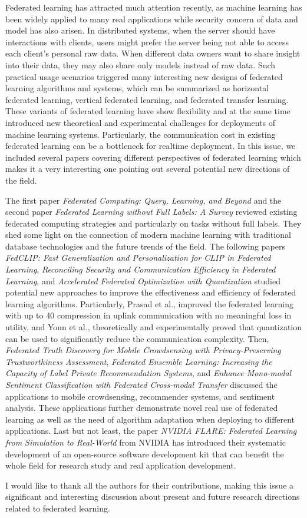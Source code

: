 \documentclass[11pt]{article}
\begin{document}
Federated learning has attracted much attention recently, as machine
learning has been widely applied to many real applications while
security concern of data and model has also arisen. In distributed
systems, when the server should have interactions with clients, users
might prefer the server being not able to access each client's
personal raw data. When different data owners want to share insight
into their data, they may also share only models instead of raw
data. Such practical usage scenarios triggered many interesting new
designs of federated learning algorithms and systems, which can be
summarized as horizontal federated learning, vertical federated
learning, and federated transfer learning. These variants of federated
learning have show flexibility and at the same time introduced new
theoretical and experimental challenges for deployments of machine
learning systems. Particularly, the communication cost in existing
federated learning can be a bottleneck for realtime deployment. In
this issue, we included several papers covering different perspectives
of federated learning which makes it a very interesting one pointing
out several potential new directions of the field.

The first paper
{\it Federated Computing: Query, Learning, and Beyond} and
the second paper
{\it Federated Learning without Full Labels: A Survey}
reviewed existing federated computing strategies and particularly on tasks without full labels.
They shed some light on the connection of modern machine learning with traditional database technologies and the future trends of the field.
The following papers
{\it FedCLIP: Fast Generalization and Personalization for CLIP in Federated Learning},
{\it Reconciling Security and Communication Efficiency in Federated Learning}, and
{\it Accelerated Federated Optimization with Quantization}
studied potential new approaches to improve the effectiveness and efficiency of federated learning algorithms.
Particularly, Prasad et al., improved the federated learning with up to 40 compression in uplink
communication with no meaningful loss in utility, and Youn et al., theoretically and experimentally proved that quantization can be used to significantly reduce the communication complexity.
Then,
{\it Federated Truth Discovery for Mobile Crowdsensing with Privacy-Preserving Trustworthiness Assessment},
{\it Federated Ensemble Learning: Increasing the Capacity of Label Private Recommendation Systems}, and
{\it Enhance Mono-modal Sentiment Classification with Federated Cross-modal Transfer}
discussed the applications to mobile crowdsensing, recommender systems, and sentiment analysis.
These applications further demonstrate novel real use of federated learning as well as the need of algorithm adaptation when deploying to different applications.
Last but not least, the paper
{\it NVIDIA FLARE: Federated Learning from Simulation to Real-World}
from NVIDIA has introduced their systematic development of an open-source software development kit that can benefit the whole field for research study and real application development.


I would like to thank all the authors for their contributions, making this issue a significant and interesting discussion about present and future research directions related to federated learning.
\end{document}
